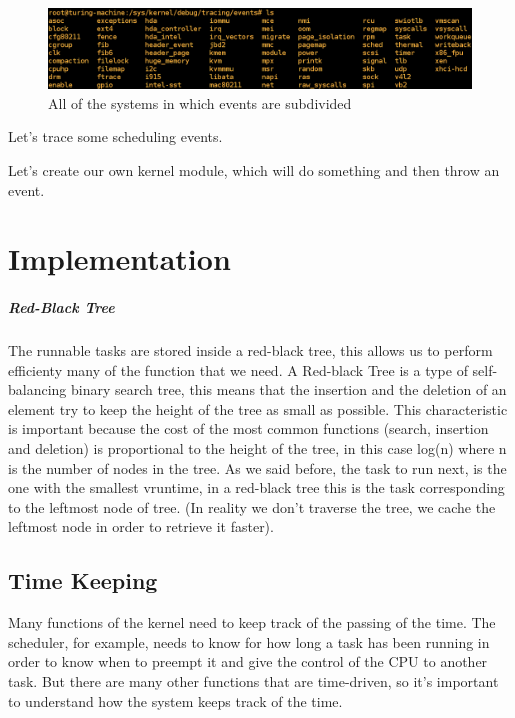 \documentclass[10pt]{book}
\begin{document}
\begin{figure}[ht]
\includegraphics[width=\textwidth]{images/shell_trace_systems.png} 
\caption{All of the systems in which events are subdivided}
\label{img:systems}
\end{figure}

Let's trace some scheduling events.

Let's create our own kernel module, which will do something and then throw an event.

\chapter{Implementation}
\label{chap:implementation}

\paragraph{Red-Black Tree}
The runnable tasks are stored inside a red-black tree, this allows us to perform efficienty many of the function that we need.
A Red-black Tree is a type of self-balancing binary search tree, this means that the insertion and the deletion of an element try to keep the height of the tree as small as possible. This characteristic is important because the cost of the most common functions (search, insertion and deletion) is proportional to the height of the tree, in this case log(n) where n is the number of nodes in the tree.
As we said before, the task to run next, is the one with the smallest vruntime, in a red-black tree this is the task corresponding to the leftmost node of tree. (In reality we don't traverse the tree, we cache the leftmost node in order to retrieve it faster).

\section{Time Keeping}%
\label{timekeeping}
Many functions of the kernel need to keep track of the passing of the time. The scheduler, for example, needs to know for how long a task has been running in order to know when to preempt it and give the control of the CPU to another task. But there are many other functions that are time-driven, so it's important to understand how the system keeps track of the time.
\end{document}
